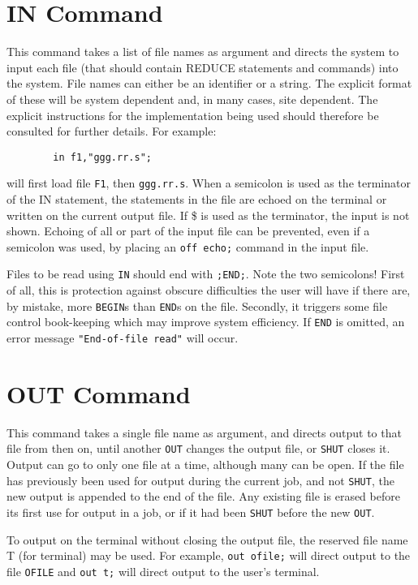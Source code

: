\documentclass[11pt,letterpaper]{book}
\makeatletter
\newcommand{\REDUCE}{REDUCE}
\newcommand{\underscore}{\_}
\newcommand{\ttindex}[1]{{\renewcommand{\_}{\protect\underscore}%
                          \index{#1@{\tt #1}}}}
\makeatother
\begin{document}
\section{IN Command}\ttindex{IN}
This command takes a list of file names as argument and directs the system
to input each file (that should contain {\REDUCE} statements
and commands) into the system.  File names can either be an identifier or
a string.  The explicit format of these will be system dependent and, in
many cases, site dependent.  The explicit instructions for the
implementation being used should therefore be consulted for further
details. For example:
{\small\begin{verbatim}
        in f1,"ggg.rr.s";
\end{verbatim}}
will first load file {\tt F1}, then {\tt ggg.rr.s}.  When a semicolon is
used as the terminator of the IN statement, the statements in the file are
echoed on the terminal or written on the current output file.  If \$
 is used as the terminator, the input is not
shown.  Echoing of all or part of the input file can be prevented, even if
a semicolon was used, by placing an {\tt off echo;}\ttindex{ECHO} command
in the input file.

Files to be read using {\tt IN} should end with {\tt ;END;}.  Note the two
semicolons!  First of all, this is protection against obscure difficulties
the user will have if there are, by mistake, more {\tt BEGIN}s than
{\tt END}s on the file.  Secondly, it triggers some file control book-keeping
which may improve system efficiency.  If {\tt END} is omitted, an error
message {\tt "End-of-file read"} will occur.

\section{OUT Command}\ttindex{OUT}
This command takes a single file name as argument, and directs output to
that file from then on, until another {\tt OUT} changes the output file,
or {\tt SHUT} closes it.  Output can go to only one file at a time,
although many can be open.  If the file has previously been used for
output during the current job, and not {\tt SHUT},\ttindex{SHUT} the new
output is appended to the end of the file.  Any existing file is erased
before its first use for output in a job, or if it had been {\tt SHUT}
before the new {\tt OUT}.

To output on the terminal without closing the output file, the reserved
file name T (for terminal) may be used.  For example,
{\tt out ofile;} will direct output to the file {\tt OFILE} and
{\tt out t;} will direct output to the user's terminal.
\end{document}
